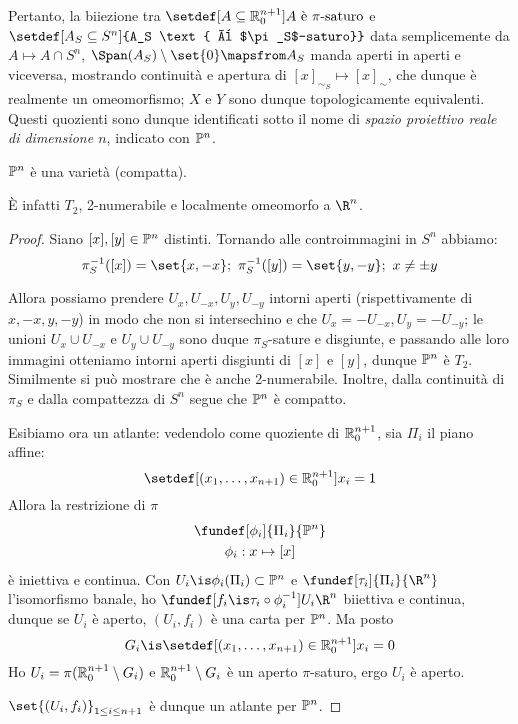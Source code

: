 Pertanto, la biiezione tra $\setdef[A \subseteq {\Ro[n+1]} ]{A \text{ è $\pi$-saturo}}$ e $\setdef[A_S\subseteq S^n]{A_S \text{ è $\pi_S$-saturo}}$ data semplicemente da $A\mapsto A\cap S^n$, $\Span(A_S)\setminus \set{0} \mapsfrom A_S$ manda aperti in aperti e viceversa, mostrando continuità e apertura di $[x]_{\sim_S}  \mapsto  [x]_\sim$, che dunque è realmente un omeomorfismo; $X$ e $Y$ sono dunque topologicamente equivalenti. Questi quozienti sono dunque identificati sotto il nome di \emph{spazio proiettivo reale di dimensione $n$}, indicato con $\Ps^n$.


\begin{prop} $\Ps^n$ è una varietà (compatta). \end{prop}
È infatti $T_2$, 2-numerabile e localmente omeomorfo a $\R^n$.

\begin{proof}
Siano $[x], [y] \in \Ps^n$ distinti. Tornando alle controimmagini in $S^n$ abbiamo: \[
\pi_S^{-1}([x]) = \set{x, -x}; \
\pi_S^{-1}([y]) = \set{y, -y}; \
x \neq \pm y \]

Allora possiamo prendere $U_x, U_{-x}, U_y, U_{-y}$ intorni aperti (rispettivamente di $x, -x, y, -y$) in modo che non si intersechino e che $U_x = -U_{-x}, U_y = -U_{-y}$; le unioni $U_x \cup U_{-x}$ e $U_y \cup U_{-y}$ sono duque $\pi_S$-sature e disgiunte, e passando alle loro immagini otteniamo intorni aperti disgiunti di $[x]$ e $[y]$, dunque $\Ps^n$ è $T_2$. Similmente si può mostrare che è anche 2-numerabile. Inoltre, dalla continuità di $\pi_S$ e dalla compattezza di $S^n$ segue che $\Ps^n $ è compatto.

Esibiamo ora un atlante: vedendolo come quoziente di $\Ro[n+1]$, sia $\Pi_i$ il piano affine: \[
\setdef[(x_1, \dots, x_{n+1})\in {\Ro[n+1]}]{x_i = 1} \]
Allora la restrizione di $\pi$
\begin{gather*}
\fundef[\phi_i]{\Pi_i}{\Ps^n} \\
\phi_i : x \mapsto [x]
\end{gather*}
è iniettiva e continua. Con $U_i \is \phi_i(\Pi_i) \subset \Ps^n$ e $\fundef[\tau_i]{\Pi_i}{\R^n}$ l'isomorfismo banale, ho $\fundef[f_i \is \tau_i \circ \phi_i^{-1}]{U_i}{\R^n}$ biiettiva e continua, dunque se $U_i$ è aperto, $(U_i, f_i)$ è una carta per $\Ps^n$. Ma posto \[
G_i \is \setdef[(x_1, \dots, x_{n+1})\in {\Ro[n+1]}]{x_i = 0} \]
Ho $U_i = \pi(\Ro[n+1] \setminus G_i)$ e $\Ro[n+1] \setminus G_i$ è un aperto $\pi$-saturo, ergo $U_i$ è aperto.

$\set{(U_i, f_i)}_{1 \leq i \leq n+1}$ è dunque un atlante per $\Ps^n$.
\end{proof}

